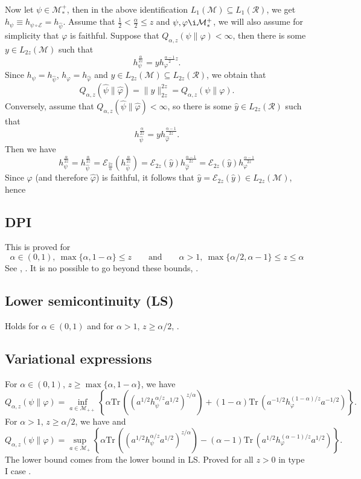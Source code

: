 \documentclass[12pt]{article}
\theoremstyle{definition}
\theoremstyle{remark}
\def\Me{\mathcal M}
\def\Ee{\mathcal E}
\def\Ra{\mathcal R}
\def \Tr{\mathrm{Tr}\,}
\begin{document}
Now let $\psi\in \Me_*^+$, then in the above identification $L_1(\Me)\subseteq
L_1(\Ra)$, we get $h_\psi\equiv h_{\psi\circ\Ee}=h_{\hat\psi}$. Assume that 
$\frac12<\frac{\alpha}2\le z$ and $\psi,\varphi\i \Me_*^+$, we will also assume for simplicity
that $\varphi$ is faithful. Suppose that $Q_{\alpha,z}(\psi\|\varphi)<\infty$, then there
is some $y\in L_{2z}(\Me)$ such that
\[
h_\psi^{\frac{\alpha}{2z}}=yh_\varphi^{\frac{\alpha-1}2z}.
\]
Since $h_\psi=h_{\hat\psi}$, $h_\varphi=h_{\hat\varphi}$ and $y\in L_{2z}(\Me)\subseteq
L_{2z}(\Ra)$, we obtain that
\[
Q_{\alpha,z}(\hat\psi\|\hat\varphi)=\|y\|_{2z}^{2z}=Q_{\alpha,z}(\psi\|\varphi).
\]
Conversely, assume that $Q_{\alpha,z}(\hat\psi\|\hat\varphi)<\infty$, so there is some
$\hat y\in L_{2z}(\Ra)$ such that 
\[
h_{\hat\psi}^{\frac{\alpha}{2z}}=yh_{\hat \varphi}^{\frac{\alpha-1}{2z}}.
\]
Then we have
\[
h_{\psi}^{\frac{\alpha}{2z}}=h_{\hat\psi}^{\frac{\alpha}{2z}}=\Ee_{\frac{2z}{\alpha}}(h_{\hat\psi}^{\frac{\alpha}{2z}})=
\Ee_{2z}(\hat y)h_{\hat\varphi}^{\frac{\alpha-1}{2z}}=\Ee_{2z}(\hat y)h_\varphi^{\frac{\alpha-1}{2z}}
\]
Since $\varphi$ (and therefore $\hat\varphi$) is faithful, it follows that $\hat
y=\Ee_{2z}(\hat y)\in L_{2z}(\Me)$, hence
\[

\]
\subsection{DPI}

This is proved for 
\[
\alpha\in (0,1),\ \max\{\alpha,1-\alpha\}
\le z \qquad\text{and}\qquad \alpha>1, \
\max\{\alpha/2,\alpha-1\}\le z\le \alpha
\]
See \cite[Thm. 1(viii)]{kato2023onrenyi}, \cite{AJnote}. It is no possible to go beyond these bounds,
\cite{zhang2020fromwyd}.

\subsection{Lower semicontinuity (LS)}

Holds for $\alpha\in (0,1)$ and for $\alpha>1$, $z\ge \alpha/2$, \cite{kato2023onrenyi}.


\subsection{Variational expressions}

For $\alpha\in (0,1)$, $z\ge\max\{\alpha,1-\alpha\}$, we have \cite[Theorem 1(vi)]{kato2023onrenyi}
\[
Q_{\alpha,z}(\psi\|\varphi)=\inf_{a\in \Me_{++}}\left\{\alpha\Tr
\left((a^{1/2}h_\psi^{\alpha/z}a^{1/2})^{z/\alpha}\right)+
(1-\alpha)\Tr\left(a^{-1/2}h_\varphi^{(1-\alpha)/z}a^{-1/2}\right)\right\}. 
\]
For $\alpha>1$, $z\ge \alpha/2$, we have \cite[Theorem 2(vi)]{kato2023onrenyi} and
\cite{SKnote}
\[
Q_{\alpha,z}(\psi\|\varphi)=\sup_{a\in \Me_+}\left\{\alpha\Tr
\left((a^{1/2}h_\psi^{\alpha/z}a^{1/2})^{z/\alpha}\right)-
(\alpha-1)\Tr\left(a^{1/2}h_\varphi^{(\alpha-1)/z}a^{1/2}\right)\right\}.
\]
The lower bound comes from the lower bound in LS. Proved for all $z>0$ in type I case
\cite{mosonyi2023thestrong}.
\end{document}
